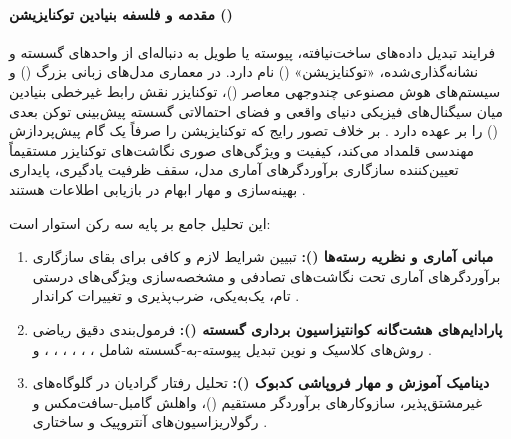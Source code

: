 \item {}

\paragraph*{مقدمه و فلسفه بنیادین توکنایزیشن ()}
فرایند تبدیل داده‌های ساخت‌نیافته، پیوسته یا طویل به دنباله‌ای از واحدهای گسسته و نشانه‌گذاری‌شده، «توکنایزیشن» () نام دارد. در معماری مدل‌های زبانی بزرگ () و سیستم‌های هوش مصنوعی چندوجهی معاصر ()، توکنایزر نقش رابط غیرخطی بنیادین میان سیگنال‌های فیزیکی دنیای واقعی و فضای احتمالاتی گسسته پیش‌بینی توکن بعدی () را بر عهده دارد \cite{gastaldi2025foundations, jia2025principles, li2025discrete}. بر خلاف تصور رایج که توکنایزیشن را صرفاً یک گام پیش‌پردازش مهندسی قلمداد می‌کند، کیفیت و ویژگی‌های صوری نگاشت‌های توکنایزر مستقیماً تعیین‌کننده سازگاری برآوردگرهای آماری مدل، سقف ظرفیت یادگیری، پایداری بهینه‌سازی و مهار ابهام در بازیابی اطلاعات هستند \cite{gastaldi2025foundations}.

این تحلیل جامع بر پایه سه رکن استوار است:
\begin{enumerate}
    \item \textbf{مبانی آماری و نظریه رسته‌ها ():} تبیین شرایط لازم و کافی برای بقای سازگاری برآوردگرهای آماری تحت نگاشت‌های تصادفی و مشخصه‌سازی ویژگی‌های درستی تام، یک‌به‌یکی، ضرب‌پذیری و تغییرات کراندار \cite{gastaldi2025foundations}.
    \item \textbf{پارادایم‌های هشت‌گانه کوانتیزاسیون برداری گسسته ():} فرمول‌بندی دقیق ریاضی روش‌های کلاسیک و نوین تبدیل پیوسته-به-گسسته شامل ، ، ، ، ، ،  و  \cite{li2025discrete, jia2025principles}.
    \item \textbf{دینامیک آموزش و مهار فروپاشی کدبوک ():} تحلیل رفتار گرادیان در گلوگاه‌های غیرمشتق‌پذیر، سازوکارهای برآوردگر مستقیم ()، واهلش گامبل-سافت‌مکس و رگولاریزاسیون‌های آنتروپیک و ساختاری \cite{li2025discrete}.
\end{enumerate}

